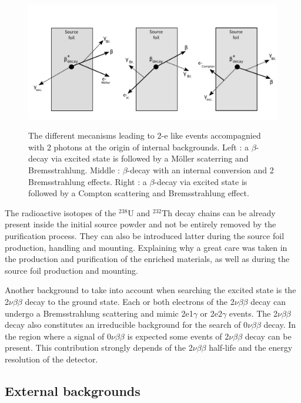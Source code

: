 \documentclass[main.tex]{subfiles}
\begin{document}
\begin{figure}[h!]
\centering
\includegraphics[scale=0.48]{pictures/Chap6/InternalBkg.pdf}
\label{InternalBkgPicture}
\caption{The different mecanisms leading to 2-e like events accompagnied with 2 photons at the origin of internal backgrounds. Left : a $\beta$-decay via excited state is followed by a M\"oller scaterring and Bremsstrahlung. Middle : $\beta$-decay with an internal conversion and 2 Bremsstrahlung effects. Right :  a $\beta$-decay via excited state is followed by a Compton scattering and Bremsstrahlung effect.}
\end{figure}


\bigskip


\NI The radioactive isotopes of the $^{\text{238}}$U and $^{\text{232}}$Th decay chains can be already present inside the initial source powder and not be entirely removed by the purification process. They can also be introduced latter during the source foil production, handling and mounting. Explaining why a great care was taken in the production and purification of the enriched materials, as well as during the source foil production and mounting.


\bigskip


\NI Another background to take into account when searching the excited state is the 2$\nu\beta\beta$ decay to the ground state. Each or both electrons of the 2$\nu\beta\beta$ decay can undergo a Bremsstrahlung scattering and mimic 2e1$\gamma$ or 2e2$\gamma$ events. The 2$\nu\beta\beta$ decay also constitutes an irreducible background for the search of 0$\nu\beta\beta$ decay. In the region where a signal of 0$\nu\beta\beta$ is expected some events of 2$\nu\beta\beta$ decay can be present. This contribution strongly depends of the 2$\nu\beta\beta$ half-life and the energy resolution of the detector.


\FloatBarrier


\subsection{External backgrounds}\label{sec:externalBkg}
\end{document}

